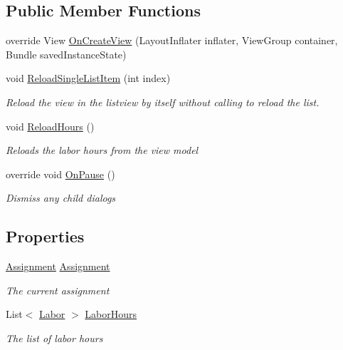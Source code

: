 \subsection*{Public Member Functions}
\begin{DoxyCompactItemize}
\item 
override View \hyperlink{class_field_service_1_1_android_1_1_fragments_1_1_labor_hour_fragment_ae01a9d37f40d21377b50aa991f8cd6c0}{On\+Create\+View} (Layout\+Inflater inflater, View\+Group container, Bundle saved\+Instance\+State)
\item 
void \hyperlink{class_field_service_1_1_android_1_1_fragments_1_1_labor_hour_fragment_aca01399a75565246a010896c4d53af94}{Reload\+Single\+List\+Item} (int index)
\begin{DoxyCompactList}\small\item\em Reload the view in the listview by itself without calling to reload the list. \end{DoxyCompactList}\item 
void \hyperlink{class_field_service_1_1_android_1_1_fragments_1_1_labor_hour_fragment_a2a77ab016ca8c51976cde66e5b2796e8}{Reload\+Hours} ()
\begin{DoxyCompactList}\small\item\em Reloads the labor hours from the view model \end{DoxyCompactList}\item 
override void \hyperlink{class_field_service_1_1_android_1_1_fragments_1_1_labor_hour_fragment_a7fa32b898536af5bfc7f4ec17520dd3d}{On\+Pause} ()
\begin{DoxyCompactList}\small\item\em Dismiss any child dialogs \end{DoxyCompactList}\end{DoxyCompactItemize}
\subsection*{Properties}
\begin{DoxyCompactItemize}
\item 
\hyperlink{class_field_service_1_1_data_1_1_assignment}{Assignment} \hyperlink{class_field_service_1_1_android_1_1_fragments_1_1_labor_hour_fragment_a49baef3a7993fa89b08cfb30363a3b33}{Assignment}
\begin{DoxyCompactList}\small\item\em The current assignment \end{DoxyCompactList}\item 
List$<$ \hyperlink{class_field_service_1_1_data_1_1_labor}{Labor} $>$ \hyperlink{class_field_service_1_1_android_1_1_fragments_1_1_labor_hour_fragment_a19d1a9881ed77b524b4cb1c86fde0e91}{Labor\+Hours}
\begin{DoxyCompactList}\small\item\em The list of labor hours \end{DoxyCompactList}\end{DoxyCompactItemize}


